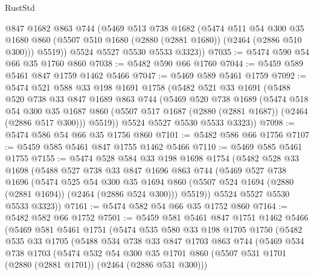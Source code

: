 \begin{lexlean}{RustStd}
\begin{coremodule}
        @847
        @1682
        @863
        @744
        (@5469
          @513
          @738
          @1682
          (@5474
            @511
            @54
            @300
            @35
            @1680
            @860
            (@5507 @510 @1680 (@2880 (@2881 @1680)) (@2464 (@2886 @510 @300)))
            @5519))
        @5524
        @5527
        @5530
        @5533
        @3323))
@7035 := @5474 @590 @54 @66 @35 @1760 @860
@7038 := @5482 @590 @66 @1760
@7044 := @5459 @589 @5461 @847 @1759 @1462 @5466
@7047 := @5469 @589 @5461 @1759
@7092 := @5474
    @521
    @588
    @33
    @198
    @1691
    @1758
    (@5482
      @521
      @33
      @1691
      (@5488
        @520
        @738
        @33
        @847
        @1689
        @863
        @744
        (@5469
          @520
          @738
          @1689
          (@5474
            @518
            @54
            @300
            @35
            @1687
            @860
            (@5507 @517 @1687 (@2880 (@2881 @1687)) (@2464 (@2886 @517 @300)))
            @5519))
        @5524
        @5527
        @5530
        @5533
        @3323))
@7098 := @5474 @586 @54 @66 @35 @1756 @860
@7101 := @5482 @586 @66 @1756
@7107 := @5459 @585 @5461 @847 @1755 @1462 @5466
@7110 := @5469 @585 @5461 @1755
@7155 := @5474
    @528
    @584
    @33
    @198
    @1698
    @1754
    (@5482
      @528
      @33
      @1698
      (@5488
        @527
        @738
        @33
        @847
        @1696
        @863
        @744
        (@5469
          @527
          @738
          @1696
          (@5474
            @525
            @54
            @300
            @35
            @1694
            @860
            (@5507 @524 @1694 (@2880 (@2881 @1694)) (@2464 (@2886 @524 @300)))
            @5519))
        @5524
        @5527
        @5530
        @5533
        @3323))
@7161 := @5474 @582 @54 @66 @35 @1752 @860
@7164 := @5482 @582 @66 @1752
@7501 := @5459
    @581
    @5461
    @847
    @1751
    @1462
    @5466
    (@5469
      @581
      @5461
      @1751
      (@5474
        @535
        @580
        @33
        @198
        @1705
        @1750
        (@5482
          @535
          @33
          @1705
          (@5488
            @534
            @738
            @33
            @847
            @1703
            @863
            @744
            (@5469
              @534
              @738
              @1703
              (@5474
                @532
                @54
                @300
                @35
                @1701
                @860
                (@5507 @531 @1701 (@2880 (@2881 @1701)) (@2464 (@2886 @531 @300)))

\end{coremodule}
\end{lexlean}
